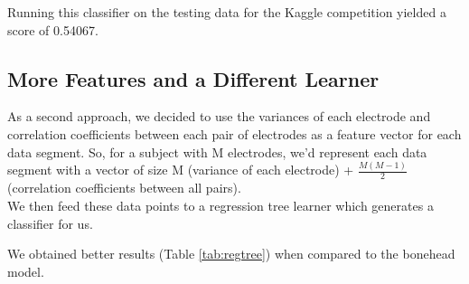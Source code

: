 \documentclass[a4paper]{article}
\begin{document}
Running this classifier on the testing data for the Kaggle competition yielded a score of 0.54067.

\subsection{More Features and a Different Learner}
As a second approach, we decided to use the variances of each electrode and correlation coefficients between each pair of electrodes as a feature vector for each data segment. So, for a subject with M electrodes, we'd represent each data segment with a vector of size M (variance of each electrode) + $\frac{M(M-1)}{2}$ (correlation coefficients between all pairs). \\
We then feed these data points to a regression tree learner which generates a classifier for us.

We obtained better results (Table \ref{tab:regtree}) when compared to the bonehead model.

\begin{table}[!htbp]
\centering
{}
\caption{Performance of the regression tree model.}
\label{tab:regtree}
\end{table}
\end{document}

